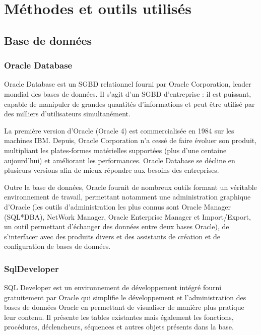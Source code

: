 \cleardoublepage
{}

\chapter{Méthodes et outils utilisés}



\section{Base de données}

	\subsection{Oracle Database}
		Oracle Database est un SGBD relationnel fourni par Oracle Corporation, leader mondial des bases de données. Il s\rq{}agit d\rq{}un SGBD d'entreprise : il est puissant, capable de manipuler de grandes quantités d'informations et peut être utilisé par des milliers d'utilisateurs simultanément.
		
		La première version d'Oracle (Oracle 4) est commercialisée en 1984 sur les machines IBM. Depuis, Oracle Corporation n\rq{}a cessé de faire évoluer son produit, multipliant les plates-formes matérielles supportées (plus d'une centaine aujourd\rq{}hui) et améliorant les performances. Oracle Database se décline en plusieurs versions afin de mieux répondre aux besoins des entreprises.
		
		Outre la base de données, Oracle fournit de nombreux outils formant un véritable environnement de travail, permettant notamment une administration graphique d'Oracle (les outils d\rq{}administration les plus connus sont Oracle Manager (SQL*DBA), NetWork Manager, Oracle Enterprise Manager et Import/Export, un outil permettant d'échanger des données entre deux bases Oracle), de s'interfacer avec des produits divers et des assistants de création et de configuration de bases de données.
	
	
	\subsection{SqlDeveloper}
		SQL Developer est un environnement de développement intégré fourni gratuitement par Oracle qui simplifie le développement et l\rq{}administration des bases de données Oracle en permettant de visualiser de manière plus pratique leur contenu. Il présente les tables existantes mais également les fonctions, procédures, déclencheurs, séquences et autres objets présents dans la base.
		
